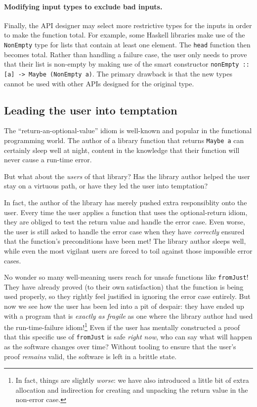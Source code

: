 \documentclass[format=sigplan, review=false, screen=true]{acmart}
\begin{document}
\paragraph{Modifying input types to exclude bad inputs.}
Finally, the API designer may select more restrictive types for the inputs in order
to make the function total. For example, some Haskell libraries make use of the
\texttt{NonEmpty} type for lists that contain at least one element. The \texttt{head}
function then becomes total. Rather than handling a failure case, the user only
needs to prove that their list is non-empty by making use of the smart constructor
\texttt{nonEmpty :: [a] -> Maybe (NonEmpty a)}. The primary drawback
is that the new types cannot be used with other APIs designed for the original type.

\subsection{Leading the user into temptation}
The ``return-an-optional-value'' idiom is well-known and popular in the functional
programming world. The author of a library function that returns \texttt{Maybe a}
can certainly sleep well at night, content in the knowledge that their function
will never cause a run-time error.

But what about the \emph{users} of that library? Has the library author helped the user stay
on a virtuous path, or have they led the user into temptation?

In fact, the author of the library has merely pushed extra responsiblity onto the user.
Every time the user applies a function that uses the optional-return idiom, they are obliged
to test the return value and handle the error case. Even worse, the user is still asked
to handle the error case when they have \emph{correctly} ensured that the function's
preconditions have been met! The library author sleeps well, while even the most vigilant
users are forced to toil against those impossible error cases.

No wonder so many well-meaning users reach for unsafe functions like \texttt{fromJust}!
They have already proved (to their own satisfaction) that the function is being used properly, so they rightly
feel justified in ignoring the error case entirely. But now we see how the user has been led into
a pit of despair: they have ended up with a program that is \emph{exactly as fragile} as one where the library
author had used the run-time-failure idiom!\footnote{In fact, things are slightly \emph{worse}: we have also introduced a little
bit of extra allocation and indirection for creating and unpacking the return value in the non-error case.}
Even if the user has mentally constructed a proof that this specific use of \texttt{fromJust} is safe \emph{right now},
who can say what will
happen as the software changes over time? Without tooling to ensure that the user's proof \emph{remains} valid,
the software is left in a brittle state.
\end{document}
